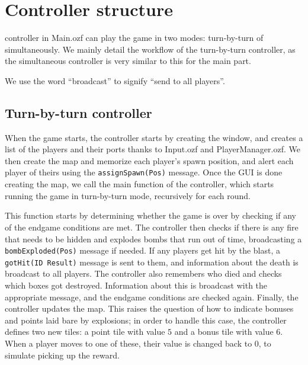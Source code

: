 \documentclass[12pt,journal]{IEEEtran}
\newcommand{\ntt}{\normalfont\ttfamily}
\newcommand{\fn}[1]{{\protect\ntt#1}}
\begin{document}
\section{Controller structure}
\label{sec:controller}
 controller in \fn{Main.ozf} can play the game in two modes: turn-by-turn of simultaneously.
We mainly detail the workflow of the turn-by-turn controller, as the simultaneous controller is very similar to this for the main part.

We use the word ``broadcast'' to signify ``send to all players''.

\subsection{Turn-by-turn controller}
When the game starts, the controller starts by creating the window, and creates a list of the players and their ports thanks to \fn{Input.ozf} and \fn{PlayerManager.ozf}.
We then create the map and memorize each player's spawn position, and alert each player of theirs using the \lstinline|assignSpawn(Pos)| message.
Once the GUI is done creating the map, we call the main function of the controller, which starts running the game in turn-by-turn mode, recursively for each round.

This function starts by determining whether the game is over by checking if any of the endgame conditions are met.
The controller then checks if there is any fire that needs to be hidden and explodes bombs that run out of time, broadcasting a \lstinline|bombExploded(Pos)| message if needed.
If any players get hit by the blast, a \lstinline|gotHit(ID Result)| message is sent to them, and information about the death is broadcast to all players.
The controller also remembers who died and checks which boxes got destroyed.
Information about this is broadcast with the appropriate message,
and the endgame conditions are checked again.
Finally, the controller updates the map.
This raises the question of how to indicate bonuses and points laid bare by explosions; in order to handle this case, the controller defines two new tiles: a point tile with value \(5\) and a bonus tile with value \(6\).
When a player moves to one of these, their value is changed back to \(0\), to simulate picking up the reward.
\end{document}
